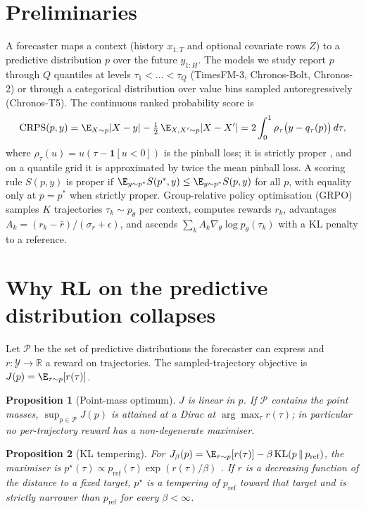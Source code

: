 \documentclass{article}
\newtheorem{proposition}{Proposition}
\newcommand{\crps}{\mathrm{CRPS}}
\begin{document}
\section{Preliminaries}
A forecaster maps a context (history $x_{1:T}$ and optional covariate rows $Z$) to a predictive distribution $p$ over the future $y_{1:H}$. The models we study report $p$ through $Q$ quantiles at levels $\tau_1<\dots<\tau_Q$ (TimesFM-3, Chronos-Bolt, Chronos-2) or through a categorical distribution over value bins sampled autoregressively (Chronos-T5). The continuous ranked probability score is
\begin{equation}
\crps(p, y) = \E_{X\sim p}|X-y| - \tfrac12\,\E_{X,X'\sim p}|X-X'| = 2\int_0^1 \rho_\tau\big(y - q_\tau(p)\big)\,d\tau,
\label{eq:crps}
\end{equation}
where $\rho_\tau(u)=u(\tau-\mathbf{1}[u<0])$ is the pinball loss; it is strictly proper \citep{gneiting2007strictly}, and on a quantile grid it is approximated by twice the mean pinball loss. A scoring rule $S(p,y)$ is proper if $\E_{y\sim p^*}S(p^*,y)\le\E_{y\sim p^*}S(p,y)$ for all $p$, with equality only at $p=p^*$ when strictly proper. Group-relative policy optimisation (GRPO) samples $K$ trajectories $\tau_k\sim p_\theta$ per context, computes rewards $r_k$, advantages $A_k=(r_k-\bar r)/(\sigma_r+\epsilon)$, and ascends $\sum_k A_k\nabla_\theta\log p_\theta(\tau_k)$ with a KL penalty to a reference.

\section{Why RL on the predictive distribution collapses}
\label{sec:collapse}
Let $\mathcal{P}$ be the set of predictive distributions the forecaster can express and $r:\mathcal{Y}\to\mathbb{R}$ a reward on trajectories. The sampled-trajectory objective is $J(p)=\E_{\tau\sim p}[r(\tau)]$.

\begin{proposition}[Point-mass optimum]
\label{prop:linear}
$J$ is linear in $p$. If $\mathcal{P}$ contains the point masses, $\sup_{p\in\mathcal{P}}J(p)$ is attained at a Dirac at $\arg\max_\tau r(\tau)$; in particular no per-trajectory reward has a non-degenerate maximiser.
\end{proposition}

\begin{proposition}[KL tempering]
\label{prop:kl}
For $J_\beta(p)=\E_{\tau\sim p}[r(\tau)]-\beta\,\mathrm{KL}(p\,\|\,p_{\mathrm{ref}})$, the maximiser is $p^\star(\tau)\propto p_{\mathrm{ref}}(\tau)\exp(r(\tau)/\beta)$ \citep{korbak2022rl}. If $r$ is a decreasing function of the distance to a fixed target, $p^\star$ is a tempering of $p_{\mathrm{ref}}$ toward that target and is strictly narrower than $p_{\mathrm{ref}}$ for every $\beta<\infty$.
\end{proposition}
\end{document}
